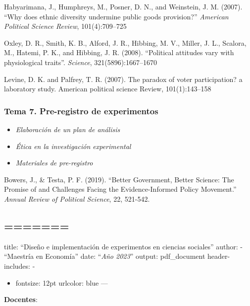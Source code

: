 \documentclass[
  12pt,
]{article}
\providecommand{\tightlist}{%
  \setlength{\itemsep}{0pt}\setlength{\parskip}{0pt}}
\begin{document}
Habyarimana, J., Humphreys, M., Posner, D. N., and Weinstein, J. M.
(2007). ``Why does ethnic diversity undermine public goods provision?''
\emph{American Political Science Review}, 101(4):709--725

Oxley, D. R., Smith, K. B., Alford, J. R., Hibbing, M. V., Miller, J.
L., Scalora, M., Hatemi, P. K., and Hibbing, J. R. (2008). ``Political
attitudes vary with physiological traits''. \emph{Science},
321(5896):1667--1670

Levine, D. K. and Palfrey, T. R. (2007). The paradox of voter
participation? a laboratory study. American political science Review,
101(1):143--158

\hypertarget{tema-7.-pre-registro-de-experimentos}{%
\subsubsection{Tema 7. Pre-registro de
experimentos}\label{tema-7.-pre-registro-de-experimentos}}

\begin{itemize}
\tightlist
\item
  \emph{Elaboración de un plan de análisis}
\item
  \emph{Ética en la investigación experimental}
\item
  \emph{Materiales de pre-registro}
\end{itemize}

Bowers, J., \& Testa, P. F. (2019). ``Better Government, Better Science:
The Promise of and Challenges Facing the Evidence-Informed Policy
Movement.'' \emph{Annual Review of Political Science}, 22, 521-542.

\hypertarget{section}{%
\subsection{=======}\label{section}}

title: ``Diseño e implementación de experimentos en ciencias sociales''
author: - ``Maestría en Economía'' date: ``\emph{Año 2023}'' output:
pdf\_document header-includes: -

\usepackage{setspace}

\begin{itemize}
\item
  \singlespacing

  fontsize: 12pt urlcolor: blue ---
\end{itemize}

\textbf{Docentes}:
\end{document}
